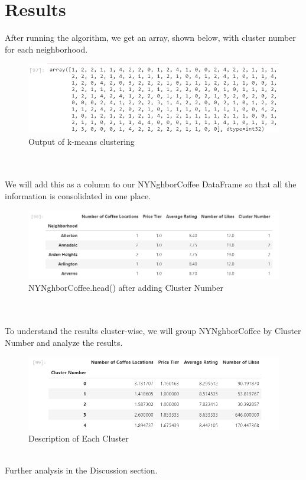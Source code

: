 \documentclass{article}
\begin{document}
\section{Results}
{After running the algorithm, we get an array, shown below, with cluster number for each neighborhood.}
\begin{figure}[h]
\caption{Output of k-means clustering}
\centering
\includegraphics[width=\textwidth]{images/Screenshot (45).png}
\end{figure}\\\\
{We will add this as a column to our NYNghborCoffee DataFrame so that all the information is consolidated in one place.}
\begin{figure}[h]
\caption{NYNghborCoffee.head() after adding Cluster Number}
\centering
\includegraphics[width=\textwidth]{images/Screenshot (43).png}
\end{figure}\\\\
{To understand the results cluster-wise, we will group NYNghborCoffee by Cluster Number and analyze the results.}
\begin{figure}[h]
\caption{Description of Each Cluster}
\centering
\includegraphics[width=\textwidth]{images/Screenshot (44).png}
\end{figure}\\
{Further analysis in the Discussion section.}
\end{document}
